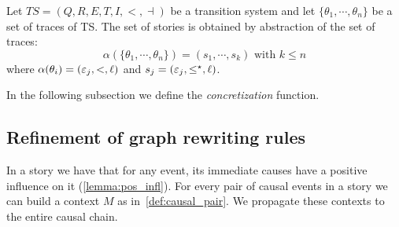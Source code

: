 \begin{definition}
  Let $TS = (Q,R,E,T,I,<,\dashv)$ be a transition system and let $\{\theta_1,\cdots,\theta_n\}$ be a set of traces of TS.
  The set of stories is obtained by abstraction of the set of traces:
  \[
  \alpha(\{\theta_1,\cdots,\theta_n\}) = (s_1,\cdots, s_k)\text{ with }k\leq n
  \]
  where $\alpha(\theta_i) = (\varepsilon_j,<,\ell)$ and $s_j = (\varepsilon_j,\leq^{\star},\ell)$.
\end{definition}



In the following subsection we define the \emph{concretization} function.

\subsection{Refinement of graph rewriting rules}

In a story we have that for any event, its immediate causes have a positive influence on it (\autoref{lemma:pos_infl}). For every pair of causal events in a story we can build a context $M$ as in~\autoref{def:causal_pair}. We propagate these contexts to the entire causal chain.

